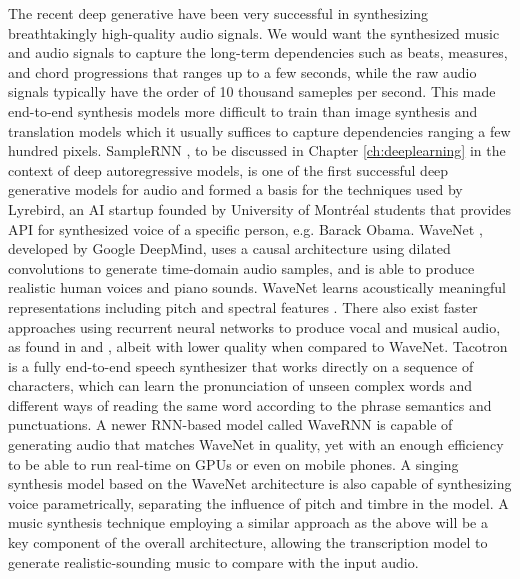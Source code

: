 The recent deep generative have been very successful in synthesizing breathtakingly high-quality audio signals.
We would want the synthesized music and audio signals to capture the long-term dependencies such as beats, measures, and chord progressions that ranges up to a few seconds, while the raw audio signals typically have the order of 10 thousand sameples per second.
This made end-to-end synthesis models more difficult to train than image synthesis and translation models which it usually suffices to capture dependencies ranging a few hundred pixels.
SampleRNN \cite{mehri2016samplernn}, to be discussed in Chapter \ref{ch:deeplearning} in the context of deep autoregressive models, is one of the first successful deep generative models for audio and formed a basis for the techniques used by Lyrebird, an AI startup founded by University of Montr\'{e}al students that provides API for synthesized voice of a specific person, e.g. Barack Obama.
WaveNet \cite{oord2016wavenet}, developed by Google DeepMind, uses a causal architecture using dilated convolutions to generate time-domain audio samples, and is able to produce realistic human voices and piano sounds.
WaveNet learns acoustically meaningful representations including pitch and spectral features \cite{hua2018wavenet}.
There also exist faster approaches using recurrent neural networks to produce vocal and musical audio, as found in \cite{nayebi2015gruv} and \cite{kalingeri2016generation}, albeit with lower quality when compared to WaveNet.
Tacotron \cite{wang2017tacotron, shen2018tacotron} is a fully end-to-end speech synthesizer that works directly on a sequence of characters, which can learn the pronunciation of unseen complex words and different ways of reading the same word according to the phrase semantics and punctuations.
A newer RNN-based model called WaveRNN \cite{kalchbrenner2018wavernn} is capable of generating audio that matches WaveNet in quality, yet with an enough efficiency to be able to run real-time on GPUs or even on mobile phones.
A singing synthesis model \cite{blaauw2017singing} based on the WaveNet architecture is also capable of synthesizing voice parametrically, separating the influence of pitch and timbre in the model.
A music synthesis technique employing a similar approach as the above will be a key component of the overall architecture, allowing the transcription model to generate realistic-sounding music to compare with the input audio.



